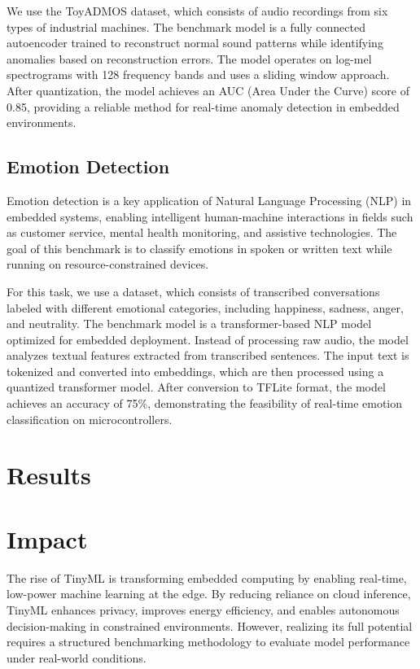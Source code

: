 \documentclass[conference]{IEEEtran}
\begin{document}
We use the ToyADMOS dataset, which consists of audio recordings from six types of industrial machines. The benchmark model is a fully connected autoencoder trained to reconstruct normal sound patterns while identifying anomalies based on reconstruction errors. The model operates on log-mel spectrograms with 128 frequency bands and uses a sliding window approach. After quantization, the model achieves an AUC (Area Under the Curve) score of 0.85, providing a reliable method for real-time anomaly detection in embedded environments.

\subsection{Emotion Detection}

Emotion detection is a key application of Natural Language Processing (NLP) in embedded systems, enabling intelligent human-machine interactions in fields such as customer service, mental health monitoring, and assistive technologies. The goal of this benchmark is to classify emotions in spoken or written text while running on resource-constrained devices.

For this task, we use a dataset, which consists of transcribed conversations labeled with different emotional categories, including happiness, sadness, anger, and neutrality. The benchmark model is a transformer-based NLP model optimized for embedded deployment. Instead of processing raw audio, the model analyzes textual features extracted from transcribed sentences. The input text is tokenized and converted into embeddings, which are then processed using a quantized transformer model. After conversion to TFLite format, the model achieves an accuracy of 75\%, demonstrating the feasibility of real-time emotion classification on microcontrollers.

\section{Results}

\section{Impact}

The rise of TinyML is transforming embedded computing by enabling real-time, low-power machine learning at the edge. By reducing reliance on cloud inference, TinyML enhances privacy, improves energy efficiency, and enables autonomous decision-making in constrained environments. However, realizing its full potential requires a structured benchmarking methodology to evaluate model performance under real-world conditions.
\end{document}
